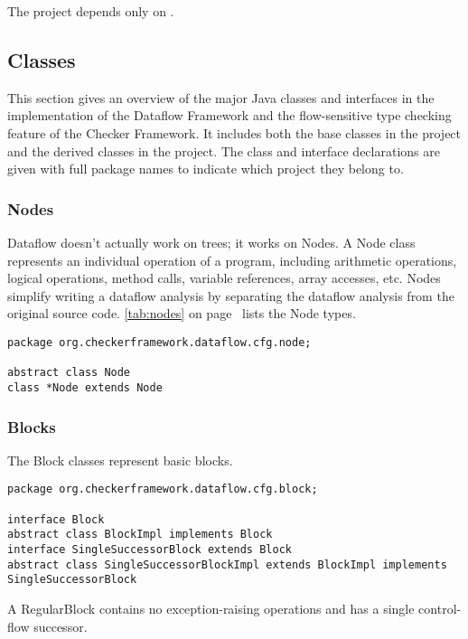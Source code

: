 The  project depends only on .


\subsection{Classes}

This section gives an overview of the major Java classes and
interfaces in the implementation of the Dataflow Framework and the
flow-sensitive type checking feature of the Checker Framework.  It
includes both the base classes in the  project and the
derived classes in the  project.  The class and
interface declarations are given with full package names to indicate
which project they belong to.

\subsubsection{Nodes}
\label{sec:node_classes}

Dataflow doesn't actually work on trees; it works on Nodes.
A Node class represents an individual operation of a program,
including arithmetic operations, logical operations, method calls,
variable references, array accesses, etc.
Nodes
simplify writing a dataflow analysis by separating the dataflow
analysis from the original source code.
\autoref{tab:nodes} on page~\pageref{tab:nodes} lists
the Node types.

\begin{verbatim}
package org.checkerframework.dataflow.cfg.node;

abstract class Node
class *Node extends Node
\end{verbatim}


\subsubsection{Blocks}
\label{sec:block_classes}

The Block
classes represent basic blocks.

\begin{verbatim}
package org.checkerframework.dataflow.cfg.block;

interface Block
abstract class BlockImpl implements Block
interface SingleSuccessorBlock extends Block
abstract class SingleSuccessorBlockImpl extends BlockImpl implements SingleSuccessorBlock
\end{verbatim}

A RegularBlock contains no exception-raising operations and has a
single control-flow successor.

